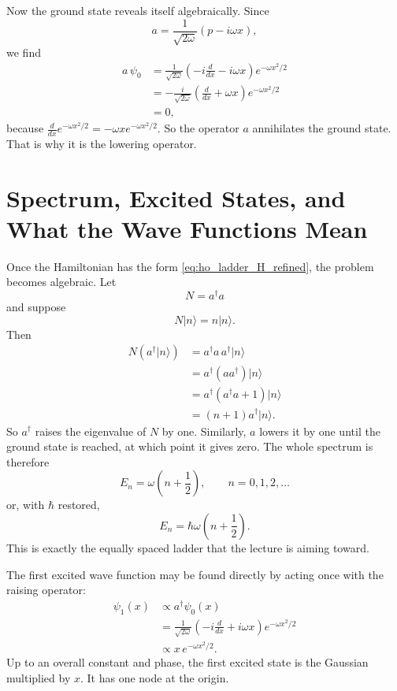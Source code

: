 Now the ground state reveals itself algebraically. Since
\begin{equation}
a=\frac{1}{\sqrt{2\omega}}(p-i\omega x),
\end{equation}
we find
\begin{align}
a\,\psi_{0}
&=
\frac{1}{\sqrt{2\omega}}
\left(
-i\frac{d}{dx}-i\omega x
\right)e^{-\omega x^{2}/2} \\
&=
-\frac{i}{\sqrt{2\omega}}
\left(
\frac{d}{dx}+\omega x
\right)e^{-\omega x^{2}/2} \\
&=
0,
\end{align}
because
\(
\frac{d}{dx}e^{-\omega x^{2}/2}=-\omega x e^{-\omega x^{2}/2}.
\)
So the operator \(a\) annihilates the ground state. That is why it is the lowering operator.

\section{Spectrum, Excited States, and What the Wave Functions Mean}

Once the Hamiltonian has the form \eqref{eq:ho_ladder_H_refined}, the problem becomes algebraic. Let
\begin{equation}
N=a^{\dagger}a
\end{equation}
and suppose
\begin{equation}
N|n\rangle=n|n\rangle.
\end{equation}
Then
\begin{align}
N(a^{\dagger}|n\rangle)
&=
a^{\dagger}a\,a^{\dagger}|n\rangle \\
&=
a^{\dagger}(aa^{\dagger})|n\rangle \\
&=
a^{\dagger}(a^{\dagger}a+1)|n\rangle \\
&=
(n+1)a^{\dagger}|n\rangle.
\end{align}
So \(a^{\dagger}\) raises the eigenvalue of \(N\) by one. Similarly, \(a\) lowers it by one until the ground state is reached, at which point it gives zero. The whole spectrum is therefore
\begin{equation}
E_{n}=\omega\left(n+\frac{1}{2}\right),
\qquad n=0,1,2,\dots
\end{equation}
or, with \(\hbar\) restored,
\begin{equation}
E_{n}=\hbar\omega\left(n+\frac{1}{2}\right).
\end{equation}
This is exactly the equally spaced ladder that the lecture is aiming toward.

The first excited wave function may be found directly by acting once with the raising operator:
\begin{align}
\psi_{1}(x)
&\propto
a^{\dagger}\psi_{0}(x) \\
&=
\frac{1}{\sqrt{2\omega}}
\left(
-i\frac{d}{dx}+i\omega x
\right)e^{-\omega x^{2}/2} \\
&\propto
x\,e^{-\omega x^{2}/2}.
\end{align}
Up to an overall constant and phase, the first excited state is the Gaussian multiplied by \(x\). It has one node at the origin.

